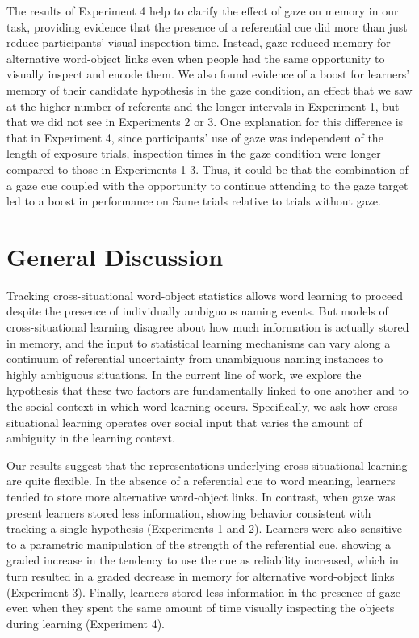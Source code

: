 \documentclass[authoryear, review]{elsarticle}
\begin{document}
The results of Experiment 4 help to clarify the effect of gaze on memory
in our task, providing evidence that the presence of a referential cue
did more than just reduce participants' visual inspection time. Instead,
gaze reduced memory for alternative word-object links even when people
had the same opportunity to visually inspect and encode them. We also
found evidence of a boost for learners' memory of their candidate
hypothesis in the gaze condition, an effect that we saw at the higher
number of referents and the longer intervals in Experiment 1, but that
we did not see in Experiments 2 or 3. One explanation for this
difference is that in Experiment 4, since participants' use of gaze was
independent of the length of exposure trials, inspection times in the
gaze condition were longer compared to those in Experiments 1-3. Thus,
it could be that the combination of a gaze cue coupled with the
opportunity to continue attending to the gaze target led to a boost in
performance on Same trials relative to trials without gaze.

\section{General Discussion}\label{general-discussion}

Tracking cross-situational word-object statistics allows word learning
to proceed despite the presence of individually ambiguous naming events.
But models of cross-situational learning disagree about how much
information is actually stored in memory, and the input to statistical
learning mechanisms can vary along a continuum of referential
uncertainty from unambiguous naming instances to highly ambiguous
situations. In the current line of work, we explore the hypothesis that
these two factors are fundamentally linked to one another and to the
social context in which word learning occurs. Specifically, we ask how
cross-situational learning operates over social input that varies the
amount of ambiguity in the learning context.

Our results suggest that the representations underlying
cross-situational learning are quite flexible. In the absence of a
referential cue to word meaning, learners tended to store more
alternative word-object links. In contrast, when gaze was present
learners stored less information, showing behavior consistent with
tracking a single hypothesis (Experiments 1 and 2). Learners were also
sensitive to a parametric manipulation of the strength of the
referential cue, showing a graded increase in the tendency to use the
cue as reliability increased, which in turn resulted in a graded
decrease in memory for alternative word-object links (Experiment 3).
Finally, learners stored less information in the presence of gaze even
when they spent the same amount of time visually inspecting the objects
during learning (Experiment 4).
\end{document}
